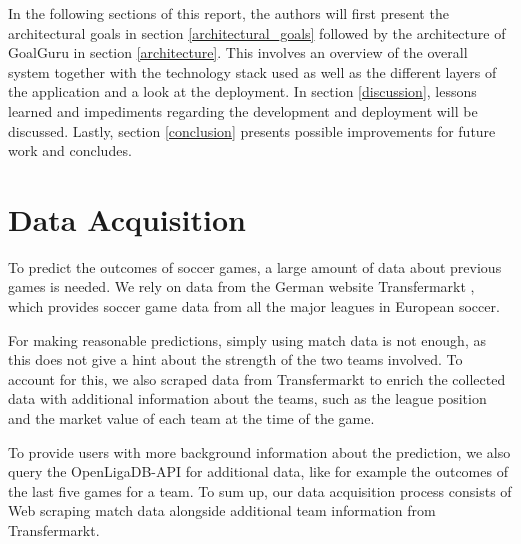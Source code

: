 \documentclass[conference,a4paper,flushend]{cs-techrep}
\begin{document}
In the following sections of this report, the authors will first present the architectural goals in section \ref{architectural_goals} followed by the architecture of GoalGuru in section \ref{architecture}. This involves an overview of the overall system together with the technology stack used as well as the different layers of the application and a look at the deployment. 
In section \ref{discussion}, lessons learned and impediments regarding the development and deployment will be discussed. Lastly,  section \ref{conclusion} presents possible improvements for future work and concludes.


\section{Data Acquisition} \label{data_aquisition}
To predict the outcomes of soccer games, a large amount of  data about previous games is needed. We rely on data from the German website Transfermarkt \cite{noauthor_fusball-transfers_nodate}, which provides soccer game data from all the major leagues in European soccer. 

For making reasonable predictions, simply using match data is not enough, as this does not give a hint about the strength of the two teams involved. To account for this, we also scraped data from Transfermarkt to enrich the collected data with additional information about the teams, such as the league position and the market value of each team at the time of the game.

To provide users with more background information about the prediction, we also query the OpenLigaDB-API \cite{noauthor_openligadb_nodate} for additional data, like for example the outcomes of the last five games for a team.
To sum up, our data acquisition process consists of Web scraping match data alongside additional team information from Transfermarkt.



\end{document}
